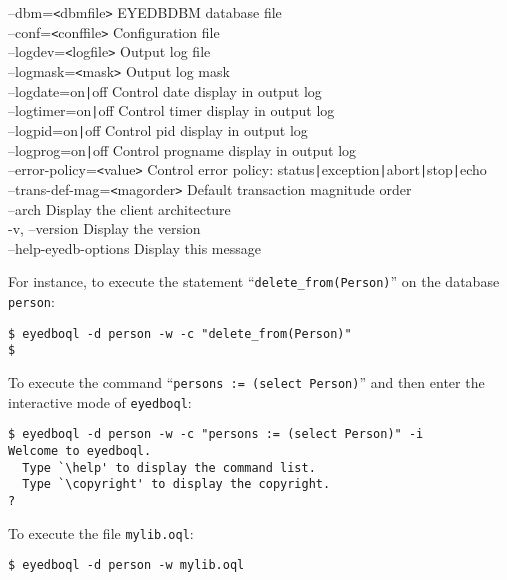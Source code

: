 \begin{tabbing}
\>  --dbm=\texttt{<}dbmfile\texttt{>}                \>     EYEDBDBM database file\\
\>  --conf=\texttt{<}conffile\texttt{>}               \>    Configuration file\\
\>  --logdev=\texttt{<}logfile\texttt{>}               \>   Output log file\\
\>  --logmask=\texttt{<}mask\texttt{>}                 \>   Output log mask\\
\>  --logdate=on\texttt{|}off                 \>   Control date display in output log\\
\>  --logtimer=on\texttt{|}off                \>   Control timer display in output log\\
\>  --logpid=on\texttt{|}off                  \>   Control pid display in output log\\
\>  --logprog=on\texttt{|}off                 \>   Control progname display in output log\\
\>  --error-policy=\texttt{<}value\texttt{>}            \>  Control error policy: status\texttt{|}exception\texttt{|}abort\texttt{|}stop\texttt{|}echo\\
\>  --trans-def-mag=\texttt{<}magorder\texttt{>}       \>   Default transaction magnitude order\\
\>  --arch                           \>   Display the client architecture\\
\>  -v, --version                    \>   Display the version\\
\>  --help-eyedb-options             \>   Display this message\\
\end{tabbing}
For instance, to execute the statement ``\texttt{delete\_from(Person)}''
on the database \texttt{person}:
\begin{verbatim}
$ eyedboql -d person -w -c "delete_from(Person)"
$
\end{verbatim}
To execute the command ``\texttt{persons := (select Person)}'' and then
enter the interactive mode of \texttt{eyedboql}:
\begin{verbatim}
$ eyedboql -d person -w -c "persons := (select Person)" -i
Welcome to eyedboql.
  Type `\help' to display the command list.
  Type `\copyright' to display the copyright.
?
\end{verbatim}
To execute the file \texttt{mylib.oql}:
\begin{verbatim}
$ eyedboql -d person -w mylib.oql
\end{verbatim}


